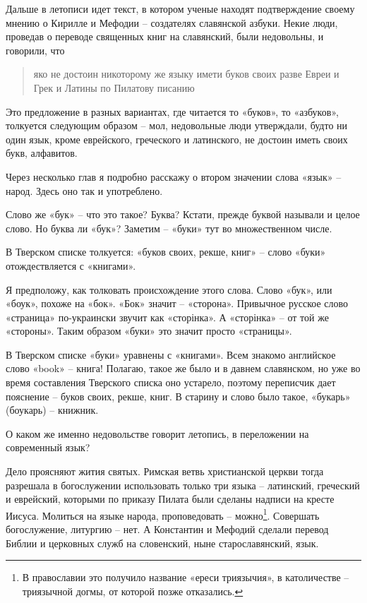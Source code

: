 Дальше в летописи идет текст, в котором ученые находят подтверждение своему мнению о Кирилле и Мефодии – создателях славянской азбуки. Некие люди, проведав о переводе священных книг на славянский, были недовольны, и говорили, что 

\begin{quotation}
яко не достоин никоторому же языку имети буков своих разве Евреи и Грек и Латины по Пилатову писанию
\end{quotation}

Это предложение в разных вариантах, где читается то «буков», то «азбуков», толкуется следующим образом – мол, недовольные люди утверждали, будто ни один язык, кроме еврейского, греческого и латинского, не достоин иметь своих букв, алфавитов.

Через несколько глав я подробно расскажу о втором значении слова «язык» – народ. Здесь оно так и употреблено.

Слово же «бук» – что это такое? Буква? Кстати, прежде буквой называли и целое слово. Но буква ли «бук»? Заметим – «буки» тут во множественном числе.

В Тверском списке толкуется: «буков своих, рекше, книг» – слово «буки» отождествляется с «книгами».

Я предположу, как толковать происхождение этого слова. Слово «бук», или «боук», похоже на «бок». «Бок» значит – «сторона». Привычное русское слово «страница» по-украински звучит как «сторінка». А «сторінка» – от той же «стороны». Таким образом «буки» это значит просто «страницы».

В Тверском списке «буки» уравнены с «книгами». Всем знакомо английское слово «book» – книга! Полагаю, такое же было и в давнем славянском, но уже во время составления Тверского списка оно устарело, поэтому переписчик дает пояснение – буков своих, рекше, книг. В старину и слово было такое, «букарь» (боукарь) – книжник.

О каком же именно недовольстве говорит летопись, в переложении на современный язык?

Дело проясняют жития святых. Римская ветвь христианской церкви тогда разрешала в богослужении использовать только три языка – латинский, греческий и еврейский, которыми по приказу Пилата были сделаны надписи на кресте Иисуса. Молиться на языке народа, проповедовать – можно\footnote{В православии это получило название «ереси триязычия», в католичестве – триязычной догмы, от которой позже отказались.}. Совершать богослужение, литургию – нет. А Константин и Мефодий сделали перевод Библии и церковных служб на словенский, ныне старославянский, язык.

